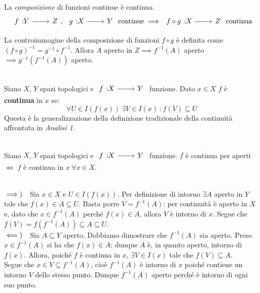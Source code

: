 \begin{theorema}~{}\label{compfunzcont}\\
La \textit{composizione} di funzioni continue è continua.
\begin{equation}
\funz{f}{Y}{Z},\ \funz{g}{X}{Y}\text{ continue}\implies \funz{f\circ g}{X}{Z}\text{ continua}
\end{equation}
\vspace{-6mm}
\end{theorema}
\begin{demonstration}
La controimmagine della composizione di funzioni $f\circ g$ è definita come $\left(f\circ g\right)^{-1}=g^{-1}\circ f^{-1}$. Allora $A$ aperto in $Z\implies f^{-1}\left(A\right)$ aperto $\implies g^{-1}\left(f^{-1}\left(A\right)\right)$ aperto.
\end{demonstration}
\begin{define}~{}\\
Siano $X$, $Y$ spazi topologici e $\funz{f}{X}{Y}$ funzione. Dato $x\in X$ $f$ è \textbf{continua} in $x$ se:
\begin{equation}
	\forall U\in I\left(f\left(x\right)\right)\ \exists V\in I\left(x\right)\ \colon f\left(V\right)\subseteq U
\end{equation}
Questa è la generalizzazione della definizione tradizionale della continuità affrontata in \textit{Analisi 1}.
\end{define}
\begin{theorema}~{}\\
Siano $X$, $Y$ spazi topologici e $\funz{f}{X}{Y}$ funzione. $f$ è continua per aperti $\iff$ $f$ è continua in $x\ \forall x\in X$.
\end{theorema}
\begin{demonstration}~{}\\
$\implies)\quad$Sia $x\in X$ e $U\in I\left(f\left(x\right)\right)$. Per definizione di intorno $\exists A$ aperto in $Y$ tale che $f\left(x\right)\in A\subseteq U$.
Basta porre $V=f^{-1}\left(A\right)$: per continuità è aperto in $X$ e, dato che $x\in f^{-1}\left(A\right)$ perché $f\left(x\right)\in A$, allora $V$ è intorno di $x$. Segue che $f\left(V\right)=f\left(f^{-1}\left(A\right)\right)\subseteq A\subseteq U$.\\
$\impliedby)\quad$Sia $A\subseteq Y$ aperto. Dobbiamo dimostrare che $f^{-1}\left(A\right)$ sia aperto. Preso $x\in f^{-1}\left(A\right)$ si ha che $f\left(x\right)\in A$; dunque $A$ è, in quanto aperto, intorno di $f\left(x\right)$. Allora, poiché $f$ è continua in $x$, $\exists V\in I\left(x\right)$ tale che $f\left(V\right)\subseteq A$.\\
Segue che $x\in V\subseteq f^{-1}\left(A\right)$, cioè $f^{-1}\left(A\right)$ è intorno di $x$ poiché contiene un intorno $V$ dello stesso punto. Dunque $f^{-1}\left(A\right)$ aperto perché è intorno di ogni suo punto.
\end{demonstration}
